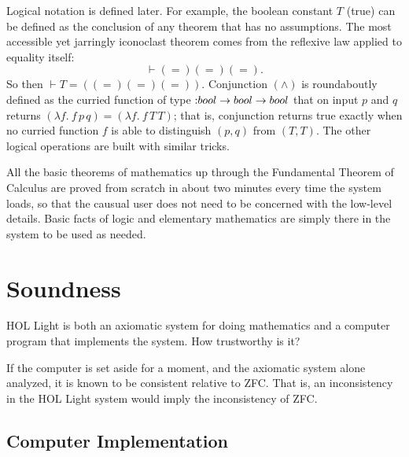 \documentclass{llncs}
\def\tc{\hbox{:}}
\begin{document}
Logical notation
is defined later.
For example, the boolean constant $T$ (true) can be defined as the conclusion of
any theorem that has no assumptions.  The most accessible yet jarringly iconoclast
theorem comes from the reflexive law applied to equality itself:
$$
\vdash ( = ) ( = ) ( = ).
$$
So then $\vdash T = ((=) (=) (=))$.  Conjunction $( \land )$
is roundaboutly defined as the
curried function of type $\tc bool\to bool\to bool$ that on input $p$ and $q$
returns $(\lambda f.\ f\, p\, q) = (\lambda f.\ f\, T\, T)$; that is,
conjunction returns  true exactly when no curried function $f$ is able to
distinguish $(p,q)$ from
$(T,T)$.
The other logical operations are built with similar tricks.

All the basic theorems of mathematics up through the Fundamental Theorem of Calculus are proved from scratch in about two minutes every time the system loads,
so
that the causual user does not need to be concerned with the low-level details.
Basic facts of logic and elementary mathematics are simply there in the system
to be used as needed.


\section{Soundness}

HOL Light is both an axiomatic system for doing mathematics and a computer program that implements the system.
How trustworthy is it?

If the computer is set aside for a moment, 
and the axiomatic system alone analyzed, it is known to be
consistent relative to ZFC.  That is, an inconsistency in
the HOL Light system would imply the inconsistency of ZFC. 



\subsection{Computer Implementation}
\end{document}
